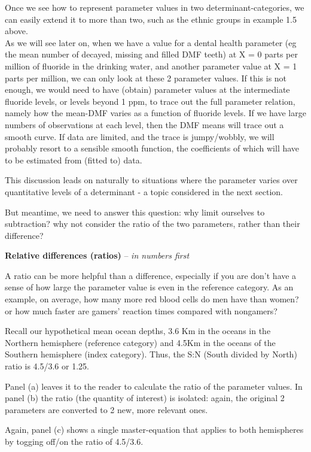 \documentclass[]{book}
\begin{document}
Once we see how to represent parameter values in two determinant-categories, we can easily extend it to more than two, such as the ethnic groups in example 1.5 above.\\
As we will see later on, when we have a value for a dental health parameter (eg the mean number of decayed, missing and filled DMF teeth) at X = 0 parts per million of fluoride in the drinking water, and another parameter value at X = 1 parts per million, we can only look at these 2 parameter values. If this is not enough, we would need to have (obtain) parameter values at the intermediate fluoride levels, or levels beyond 1 ppm, to trace out the full parameter relation, namely how the mean-DMF varies as a function of fluoride levels. If we have large numbers of observations at each level, then the DMF means will trace out a smooth curve. If data are limited, and the trace is jumpy/wobbly, we will probably resort to a sensible smooth function, the coefficients of which will have to be estimated from (fitted to) data.

This discussion leads on naturally to situations where the parameter varies over quantitative levels of a determinant - a topic considered in the next section.

But meantime, we need to answer this question: why limit ourselves to subtraction? why not consider the ratio of the two parameters, rather than their difference?

\textbf{Relative differences (ratios)} -- \emph{in numbers first}

A ratio can be more helpful than a difference, especially if you are don't have a sense of how large the parameter value is even in the reference category. As an example, on average, how many more red blood cells do men have than women? or how much faster are gamers' reaction times compared with nongamers?

Recall our hypothetical mean ocean depths, 3.6 Km in the
oceans in the Northern hemisphere (reference category) and 4.5Km in the oceans of the Southern hemisphere (index category). Thus, the S:N (South divided by North) ratio is 4.5/3.6 or 1.25.

Panel (a) leaves it to the reader to calculate the ratio of the parameter values. In panel (b) the ratio (the quantity of interest) is isolated: again, the original 2 parameters are converted to 2 new, more relevant ones.

Again, panel (c) shows a single master-equation that applies to both hemispheres by togging off/on the ratio of 4.5/3.6.
\end{document}
